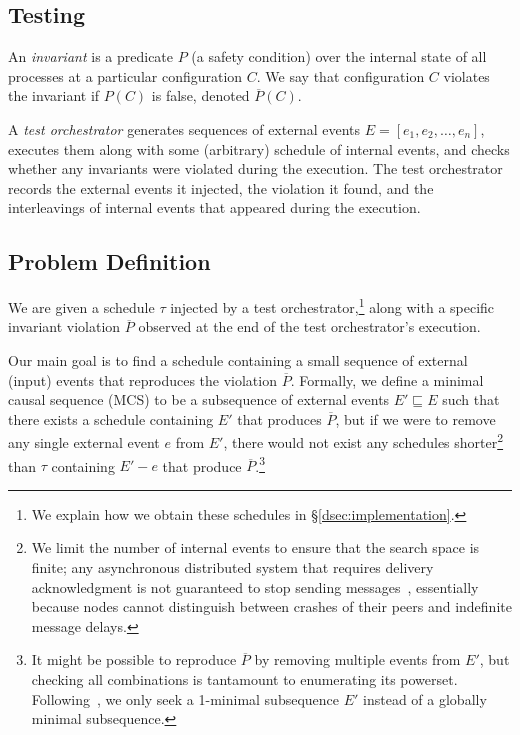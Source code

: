 \subsection{Testing}

An {\em invariant} is a predicate $P$ (a safety
condition) over the internal state of all processes at a particular
configuration $C$. We say that configuration
$C$ violates the invariant if $P\left(C\right)$ is false, denoted $\overline{P}\left(C\right)$.

A {\em test orchestrator} generates sequences of external events
$E = [ e_1, e_2, \ldots, e_n ]$, executes them along with some
(arbitrary) schedule of internal
events, and checks whether any invariants were violated during the execution.
The test orchestrator records the external events it injected, the
violation it found, and the
interleavings of internal events that appeared during the execution.

\subsection{Problem Definition}

We are given a schedule $\tau$ injected by a test orchestrator,\footnote{We
explain how we obtain these schedules in \S\ref{dsec:implementation}.} along
with a specific invariant violation $\overline{P}$ observed at the end of the
test orchestrator's execution.

Our main goal is to find a schedule containing a small sequence of
external (input) events that reproduces the violation $\overline{P}$.
Formally, we define a minimal causal sequence (MCS)
to be a subsequence of external events $E' \sqsubseteq E$ such that there exists
a schedule containing $E'$ that produces
$\overline{P}$, but if we were to remove any
single external event $e$ from $E'$, there would not exist any schedules
shorter\footnote{We limit the number of internal events to ensure
that the search space is finite; any asynchronous
distributed system that requires
delivery acknowledgment is not guaranteed
to stop sending messages~\cite{aguilera1997heartbeat}, essentially because nodes cannot distinguish
between crashes of their peers and indefinite message delays.} than $\tau$
containing $E' - e$ that produce
$\overline{P}$.\footnote{It might be possible to reproduce $\overline{P}$ by
removing multiple events from $E'$,
but checking all combinations is tantamount to enumerating its powerset.
Following~\cite{Zeller:2002:SIF:506201.506206}, we
only seek a 1-minimal subsequence $E'$ instead of a globally minimal
subsequence.}

